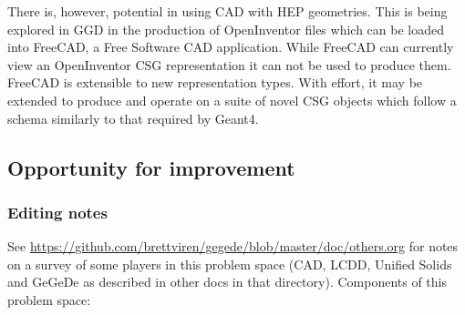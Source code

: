There is, however, potential in using CAD with HEP geometries.  This
is being explored in GGD in the production of OpenInventor files which
can be loaded into FreeCAD, a Free Software CAD application.  While
FreeCAD can currently view an OpenInventor CSG representation it can
not be used to produce them.  FreeCAD is extensible to new
representation types.  With effort, it may be extended to produce and
operate on a suite of novel CSG objects which follow a schema
similarly to that required by Geant4.


\subsection{Opportunity for improvement}


\subsubsection{Editing notes}



See
\url{https://github.com/brettviren/gegede/blob/master/doc/others.org}
for notes on a survey of some players in this problem space (CAD,
LCDD, Unified Solids and GeGeDe as described in other docs in that
directory).  Components of this problem space:

